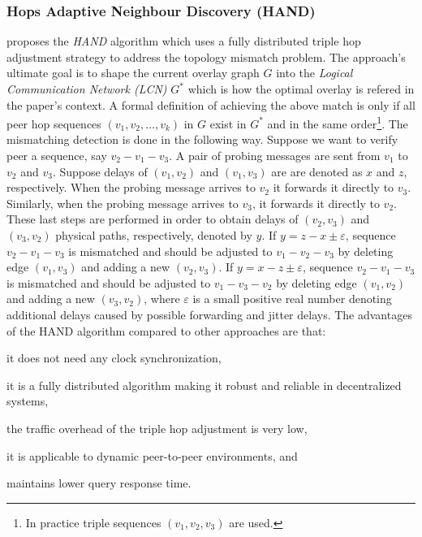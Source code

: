 \subsubsection{Hops Adaptive Neighbour Discovery (HAND)}
\cite{chen_hand_2006} proposes the \emph{HAND} algorithm which uses a
fully distributed triple hop adjustment strategy to address the topology
mismatch problem. The approach's ultimate goal is to shape the current overlay
graph $G$ into the \emph{Logical Communication Network (LCN)} $G^{*}$ which is
how the optimal overlay is refered in the paper's context. A formal
definition of achieving the above match is only if all peer hop sequences $(v_1,
v_2, \ldots, v_k)$ in $G$ exist in $G^{*}$ and in the same order\footnote{In
practice triple sequences $(v_1, v_2, v_3)$ are used.}. The mismatching
detection is done in the following way. Suppose we want to verify peer a
sequence, say $v_2-v_1-v_3$. A pair of probing messages are sent from $v_1$ to
$v_2$ and $v_3$. Suppose delays of $(v_1,v_2)$ and $(v_1,v_3)$ are are denoted
as $x$ and $z$, respectively. When the probing message arrives to $v_2$ it
forwards it directly to $v_3$. Similarly, when the probing message arrives to
$v_3$, it forwards it directly to $v_2$. These last steps are performed in order
to obtain delays of $(v_2,v_3)$ and $(v_3,v_2)$ physical paths, respectively,
denoted by $y$. If $y=z-x\pm\varepsilon$, sequence $v_2-v_1-v_3$ is mismatched
and should be adjusted to $v_1-v_2-v_3$ by deleting edge $(v_1,v_3)$ and adding
a new $(v_2,v_3)$. If $y=x-z\pm\varepsilon$, sequence $v_2-v_1-v_3$ is
mismatched and should be adjusted to $v_1-v_3-v_2$ by deleting edge $(v_1,v_2)$
and adding a new $(v_3,v_2)$, where $\varepsilon$ is a small positive real
number denoting additional delays caused by possible forwarding and jitter
delays. The advantages of the HAND algorithm compared to other approaches are
that:
\begin{inparaenum}
  \item it does not need any clock synchronization,
  \item it is a fully distributed algorithm making it robust and reliable in
        decentralized systems,
  \item the traffic overhead of the triple hop adjustment is very low,
  \item it is applicable to dynamic peer-to-peer environments, and
  \item maintains lower query response time.
\end{inparaenum}

